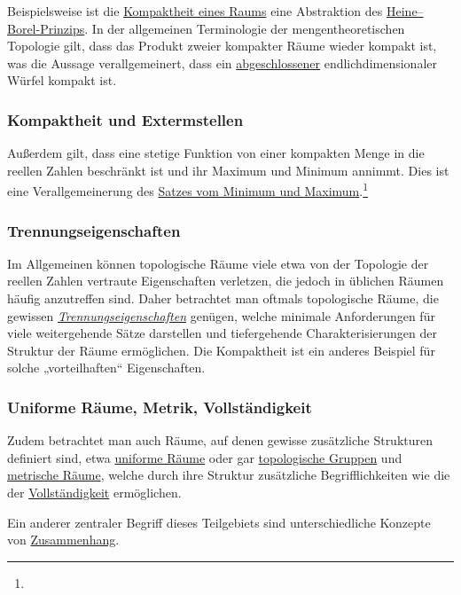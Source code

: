 \documentclass[12pt,]{article}
\begin{document}
Beispielsweise ist die \href{Kompakter_Raum}{Kompaktheit eines Raums}
eine Abstraktion des \href{Satz_von_Heine-Borel}{Heine--Borel-Prinzips}.
In der allgemeinen Terminologie der mengentheoretischen Topologie gilt,
dass das Produkt zweier kompakter Räume wieder kompakt ist, was die
Aussage verallgemeinert, dass ein
\href{Abgeschlossene_Menge}{abgeschlossener} endlichdimensionaler Würfel
kompakt ist.

\subsubsection{Kompaktheit und
Extermstellen}\label{kompaktheit-und-extermstellen}

Außerdem gilt, dass eine stetige Funktion von einer kompakten Menge in
die reellen Zahlen beschränkt ist und ihr Maximum und Minimum annimmt.
Dies ist eine Verallgemeinerung des
\href{Satz_vom_Minimum_und_Maximum}{Satzes vom Minimum und
Maximum}.\footnote{}

\subsubsection{Trennungseigenschaften}\label{trennungseigenschaften}

Im Allgemeinen können topologische Räume viele etwa von der Topologie
der reellen Zahlen vertraute Eigenschaften verletzen, die jedoch in
üblichen Räumen häufig anzutreffen sind. Daher betrachtet man oftmals
topologische Räume, die gewissen
\emph{\href{Trennungseigenschaft}{Trennungseigenschaften}} genügen,
welche minimale Anforderungen für viele weitergehende Sätze darstellen
und tiefergehende Charakterisierungen der Struktur der Räume
ermöglichen. Die Kompaktheit ist ein anderes Beispiel für solche
„vorteilhaften`` Eigenschaften.

\subsubsection{Uniforme Räume, Metrik,
Vollständigkeit}\label{uniforme-ruxe4ume-metrik-vollstuxe4ndigkeit}

Zudem betrachtet man auch Räume, auf denen gewisse zusätzliche
Strukturen definiert sind, etwa \href{Uniformer_Raum}{uniforme Räume}
oder gar \href{topologische_Gruppe}{topologische Gruppen} und
\href{Metrischer_Raum}{metrische Räume}, welche durch ihre Struktur
zusätzliche Begrifflichkeiten wie die der
\href{Vollständiger_Raum}{Vollständigkeit} ermöglichen.

Ein anderer zentraler Begriff dieses Teilgebiets sind unterschiedliche
Konzepte von \href{Zusammenhängender_Raum}{Zusammenhang}.
\end{document}
